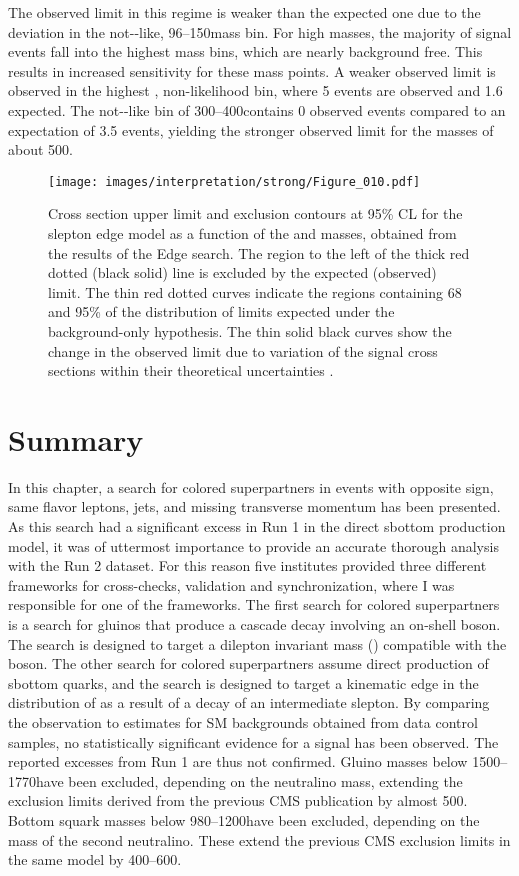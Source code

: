 The observed limit in this regime is weaker than the expected one due to the deviation in the not-\ttbar-like, 96--150\GeV mass bin.
For high \secondchi masses, the majority of signal events fall into the highest mass bins, which are nearly background free. 
This results in increased sensitivity for these mass points. 
A weaker observed limit is observed in the highest \mll, non-\ttbar likelihood bin, where 5 events are observed and 1.6 expected.   
The not-\ttbar-like \mll bin of 300--400\GeV contains 0 observed events compared to an expectation of 3.5 events, yielding the stronger observed limit for the \secondchi masses of about 500\GeV.
\begin{figure}
  \centering
    \texttt{[image: images/interpretation/strong/Figure\_010.pdf]}
    \caption{Cross section upper limit and exclusion contours at 95\% CL for the slepton edge model as a function of the \sbottom and \secondchi masses, obtained from the results of the Edge search.
The region to the left of the thick red dotted (black solid) line is excluded by the expected (observed) limit.
The thin red dotted curves indicate the regions containing 68 and 95\% of the distribution of limits expected under the background-only hypothesis.
The thin solid black curves show the change in the observed limit due to variation of the signal cross sections within their theoretical uncertainties \cite{Sirunyan:2017qaj}.} 
\label{fig:Limits2}
\end{figure}
\section{Summary}
\noindent\justify
In this chapter, a search for colored superpartners in events with opposite sign, same flavor leptons, jets, and missing transverse momentum has been presented. 
As this search had a significant excess in Run 1 in the direct sbottom production model, it was of uttermost importance to provide an accurate thorough analysis with the Run 2 dataset. 
For this reason five institutes provided three different frameworks for cross-checks, validation and synchronization, where I was responsible for one of the frameworks.  
\newpara
\noindent\justify
The first search for colored superpartners is a search for gluinos that produce a cascade decay involving an on-shell \PZ boson. 
The search is designed to target a dilepton invariant mass (\mll) compatible with the \PZ boson. 
The other search for colored superpartners assume direct production of sbottom quarks, and the search is designed to target a kinematic edge in the distribution of \mll as a result of a decay of an intermediate slepton.
By comparing the observation to estimates for SM backgrounds obtained from data control samples, no statistically significant evidence for a signal has been observed.
The reported excesses from Run 1 are thus not confirmed. 
\newpara
\noindent\justify
Gluino masses below 1500--1770\GeV have been excluded, depending on the neutralino mass, extending the exclusion limits derived from the previous CMS publication by almost 500\GeV.
Bottom squark masses below 980--1200\GeV have been excluded, depending on the mass of the second neutralino.
These extend the previous CMS exclusion limits in the same model by 400--600\GeV.
